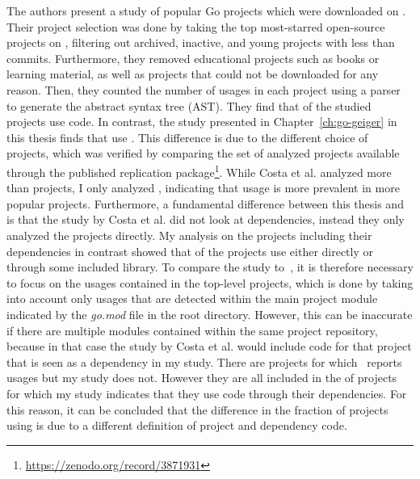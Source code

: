 The authors present a study of  popular Go projects which were downloaded on
.
Their project selection was done by taking the top  most-starred open-source projects on \github{},
filtering out archived, inactive, and young projects with less than  commits.
Furthermore, they removed educational projects such as books or learning material, as well as projects that could not be
downloaded for any reason.
Then, they counted the number of \unsafe{} usages in each project using a parser to generate the abstract syntax tree
(\acrshort{AST}).
They find that  of the studied projects use \unsafe{} code.
In contrast, the study presented in Chapter~\ref{ch:go-geiger} in this thesis finds that \percentageUnsafeProjects{}
use \unsafe{}.
This difference is due to the different choice of projects, which was verified by comparing the set of analyzed projects
available through the published replication package\footnote{\url{https://zenodo.org/record/3871931}}.
While Costa et al. analyzed more than  projects, I only analyzed \projsAnalyzed{}, indicating that
\unsafe{} usage is more prevalent in more popular projects.
Furthermore, a fundamental difference between this thesis and~\cite{costa2020} is that the study by Costa et al. did not
look at dependencies, instead they only analyzed the projects directly.
My analysis on the projects including their dependencies in contrast showed that
\percentageUnsafeTransitiveWithDependencies{} of the projects use \unsafe{} either directly or through some included
library.
To compare the study to~\cite{costa2020}, it is therefore necessary to focus on the \unsafe{} usages contained in the
top-level projects, which is done by taking into account only usages that are detected within the main project module
indicated by the \textit{go.mod} file in the root directory.
However, this can be inaccurate if there are multiple modules contained within the same project repository, because in
that case the study by Costa et al. would include code for that project that is seen as a dependency in my study.
There are  projects for which~\cite{costa2020} reports \unsafe{} usages  but my study does not.
However they are all included in the \percentageUnsafeTransitiveWithDependencies{} of projects for which my study
indicates that they use \unsafe{} code through their dependencies.
For this reason, it can be concluded that the difference in the fraction of projects using \unsafe{} is due to a
different definition of project and dependency code.

